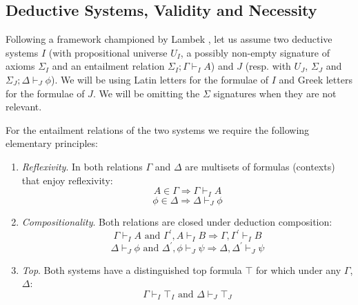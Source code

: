 \subsection{Deductive Systems, Validity and Necessity}
Following a framework championed by Lambek \cite{Lambek1968,Lambek1969}, let us  assume two deductive systems $I$ 
(with propositional universe $U_I$, 
a possibly non-empty signature of axioms $\Sigma_I$ and an entailment relation $\Sigma_I;\Gamma\vdash_{I}A$) and $J$ 
(resp. with  $U_J$, $\Sigma_J$ and $\Sigma_J;\Delta\vdash_J \phi$). We will be using Latin letters for the formulae of $I$ and Greek letters for the formulae of $J$.
We will be omitting the $\Sigma$ signatures when they are not relevant.

For the  entailment relations of the two systems we require the following elementary principles:
\begin{enumerate}
	\item \textit{Reflexivity}. In both relations $\Gamma$ and $\Delta$ are multisets of formulas (contexts) that enjoy reflexivity:
	$$A \in \Gamma \Longrightarrow \Gamma\vdash_{I}A$$ $$\phi \in \Delta \Longrightarrow \Delta\vdash_{J}\phi$$
	\item \textit{Compositionality}.  Both relations are closed under deduction composition:  
	$$\Gamma\vdash_I A \text{\ and\ } \Gamma^{'},A\vdash_{I} B \Longrightarrow \Gamma,\Gamma^{'}\vdash_I B $$  
	$$\Delta\vdash_J\phi \text{\ and\ } \Delta^{'},\phi\vdash_{J} \psi \Longrightarrow \Delta,\Delta^{'}\vdash_J \psi$$ 
	\item \textit{Top}. Both systems have a distinguished top formula $\top$ for which under any $\Gamma$, $\Delta$: $$\Gamma\vdash_{I}\top_I \text{\ and \ }
	\Delta \vdash_J\top_J$$
\end{enumerate}

